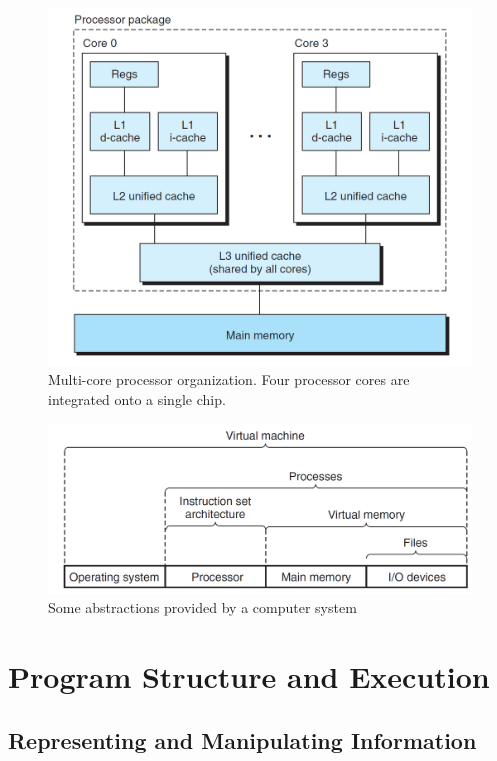 \begin{figure}[h!]
    \centering
    \includegraphics[scale=0.5]{pic/section12/pic9.png}
    \caption{Multi-core processor organization. Four processor cores are integrated onto a single chip.}
\end{figure}


\begin{figure}[h!]
    \centering
    \includegraphics[scale=0.3]{pic/section12/pic10.png}
    \caption{Some abstractions provided by a computer system}
\end{figure}


\part{ Program Structure and Execution}

\chapter{Representing and Manipulating Information}


